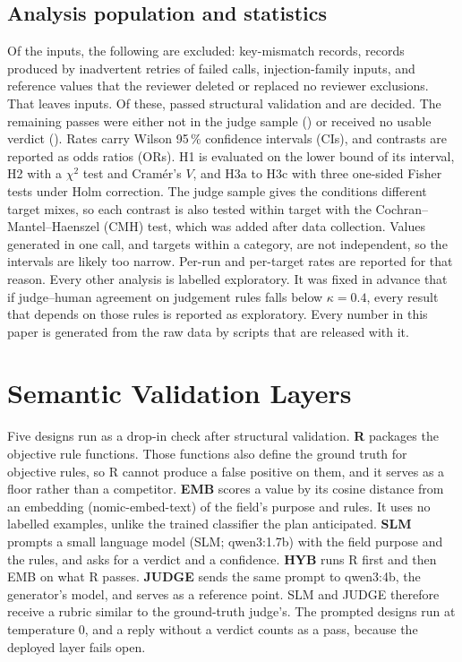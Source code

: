 \documentclass[conference]{IEEEtran}
\begin{document}
\subsection{Analysis population and statistics}
Of the  inputs, the following are excluded:  key-mismatch records,
 records produced by inadvertent retries of failed calls,  injection-family
inputs, and\ifreviewed{}  reference values that the reviewer deleted or
replaced\else{} no reviewer exclusions\fi. That leaves  inputs. Of these, 
passed structural validation and  are decided. The remaining passes were either not in
the judge sample () or received no usable verdict
(). Rates carry Wilson 95\,\% confidence intervals (CIs), and contrasts are
reported as odds ratios (ORs). H1 is evaluated on the lower bound of its interval, H2 with a $\chi^2$
test and Cram\'er's $V$, and H3a to H3c with three one-sided Fisher tests under Holm correction. The
judge sample gives the conditions different target mixes, so each contrast is also tested within target
with the Cochran--Mantel--Haenszel (CMH) test, which was added after data collection. Values generated
in one call, and targets within a category, are not independent, so the intervals are likely too
narrow. Per-run and per-target rates are reported for that reason. Every other analysis is labelled
exploratory. It was fixed in advance that if judge--human agreement on judgement rules falls below
$\kappa=0.4$, every result that depends on those rules is reported as exploratory. Every number in this
paper is generated from the raw data by scripts that are released with it.

\section{Semantic Validation Layers}
\label{sec:layer}

Five designs run as a drop-in check after structural validation. \textbf{R} packages the objective
rule functions. Those functions also define the ground truth for objective rules, so R cannot produce a
false positive on them, and it serves as a floor rather than a competitor. \textbf{EMB} scores a value
by its cosine distance from an embedding (nomic-embed-text) of the field's purpose and rules. It uses
no labelled examples, unlike the trained classifier the plan anticipated. \textbf{SLM} prompts a small
language model (SLM; qwen3:1.7b) with the field purpose and the rules, and asks for a verdict and a
confidence. \textbf{HYB} runs R first and then EMB on what R passes. \textbf{JUDGE} sends the same
prompt to qwen3:4b, the generator's model, and serves as a reference point. SLM and JUDGE therefore
receive a rubric similar to the ground-truth judge's. The prompted designs run at temperature 0, and a
reply without a verdict counts as a pass, because the deployed layer fails open.
\end{document}
